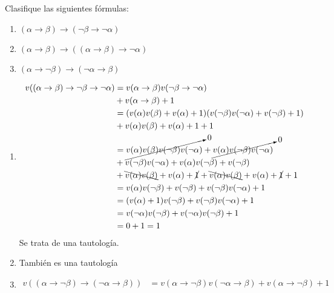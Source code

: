 \begin{ejercicio}
    Clasifique las siguientes fórmulas:
    \begin{enumerate}
        \item $(\alpha\rightarrow\beta)\rightarrow(\lnot\beta\rightarrow\lnot\alpha)$
        \item $(\alpha\rightarrow\beta)\rightarrow((\alpha\rightarrow\beta)\rightarrow\lnot\alpha)$
        \item $(\alpha\rightarrow\lnot\beta)\rightarrow(\lnot\alpha\rightarrow\beta)$
    \end{enumerate}

    \begin{enumerate}
        \item 
            \begin{align*}
                v((\alpha\rightarrow\beta)\rightarrow\lnot\beta\rightarrow\lnot\alpha)  &= v(\alpha\rightarrow\beta)v(\lnot\beta\rightarrow\lnot\alpha)\\
                &+ v(\alpha\rightarrow\beta) + 1 \\
                &= (v(\alpha)v(\beta)+v(\alpha) + 1) (v(\lnot\beta)v(\lnot\alpha)+v(\lnot\beta)+1) \\
                &+ v(\alpha)v(\beta)+v(\alpha)+1+1 \\
                &= \cancelto{0}{v(\alpha)v(\beta)v(\lnot\beta)v(\lnot\alpha)}+\cancelto{0}{v(\alpha)v(\lnot\beta)v(\lnot\alpha)} \\
                &+ v(\lnot\beta)v(\lnot\alpha) + v(\alpha)v(\lnot\beta)+v(\lnot\beta) \\
                &+ \bcancel{v(\alpha)v(\beta)}+v(\alpha)+\cancel{1}+ \bcancel{v(\alpha)v(\beta)}+v(\alpha)+\cancel{1} +1\\
                &= v(\alpha)v(\lnot\beta)+v(\lnot\beta)+v(\lnot\beta)v(\lnot\alpha)+1 \\
                &= (v(\alpha)+1) v(\lnot\beta)+v(\lnot\beta)v(\lnot\alpha) + 1 \\
                &= v(\lnot\alpha)v(\lnot\beta) + v(\lnot\alpha)v(\lnot\beta) + 1 \\
                &= 0 + 1 = 1
            \end{align*}
            Se trata de una tautología.
        \item También es una tautología %
        \item 
            \begin{align*}
                v((\alpha\rightarrow\lnot\beta)\rightarrow(\lnot\alpha\rightarrow\beta)) &= v(\alpha\rightarrow\lnot\beta)v(\lnot\alpha\rightarrow\beta)+v(\alpha\rightarrow\lnot\beta) + 1 \\

\end{align*}
\end{enumerate}
\end{ejercicio}
